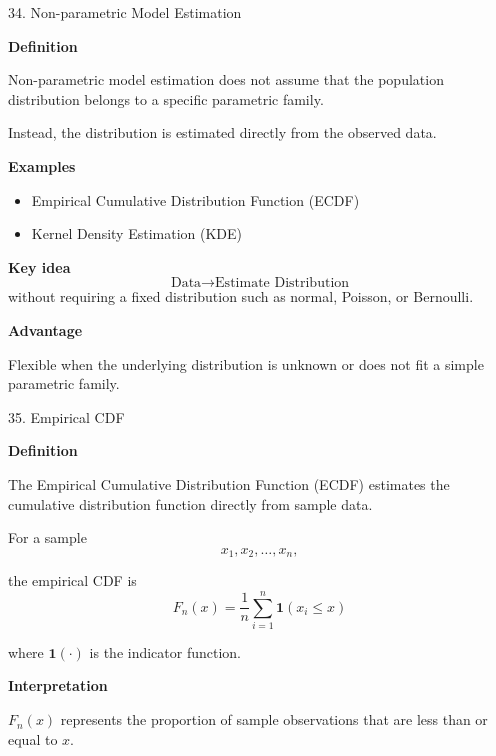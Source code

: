 
\begin{frame}{34. Non-parametric Model Estimation}

\textbf{Definition}

Non-parametric model estimation does not assume that the
population distribution belongs to a specific parametric family.

Instead, the distribution is estimated directly from the
observed data.

\textbf{Examples}

\begin{itemize}
    \item Empirical Cumulative Distribution Function (ECDF)
    \item Kernel Density Estimation (KDE)
\end{itemize}

\textbf{Key idea}
\[
\boxed{
\text{Data}
\longrightarrow
\text{Estimate Distribution}
}
\]
without requiring a fixed distribution such as normal,
Poisson, or Bernoulli.

\textbf{Advantage}

Flexible when the underlying distribution is unknown or
does not fit a simple parametric family.

\end{frame}



\begin{frame}{35. Empirical CDF}

\textbf{Definition}

The Empirical Cumulative Distribution Function (ECDF) estimates
the cumulative distribution function directly from sample data.

\vspace{0.4cm}

For a sample
\[
x_1,x_2,\ldots,x_n,
\]

the empirical CDF is
\[
\boxed{
F_n(x)
=
\frac{1}{n}
\sum_{i=1}^{n}
\mathbf{1}(x_i\leq x)
}
\]

where $\mathbf{1}(\cdot)$ is the indicator function.

\textbf{Interpretation}

$F_n(x)$ represents the proportion of sample observations
that are less than or equal to $x$.

\end{frame}


